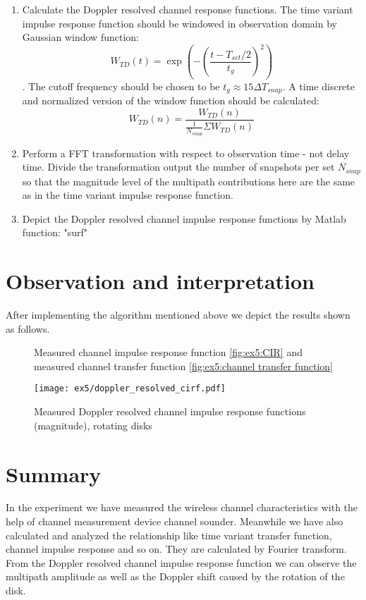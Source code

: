 \begin{enumerate}
	\item Calculate the Doppler resolved channel response functions. The time variant impulse response function should be windowed in observation domain by Gaussian window function:
	$$ W_{TD}(t) = \exp \left( - \left( \frac{t-T_{set}/2}{t_g} \right)^2 \right) $$.
	The cutoff frequency should be chosen to be $t_g \approx 15 \Delta T_{snap}$. A time discrete and normalized version of the window function should be calculated:
	$$ W_{TD} (n) = \frac{W_{TD}(n)}{\frac{1}{N_{snap}} \Sigma W_{TD} (n)} $$
	\item Perform a FFT transformation with respect to observation time - not delay time. Divide the transformation output the number of snapshots per set $N_{snap}$ so that the magnitude level of the multipath contributions here are the same as in the time variant impulse response function.
	\item Depict the Doppler resolved channel impulse response functions by Matlab function: "surf"
\end{enumerate}
\section{Observation and interpretation}
After implementing the algorithm mentioned above we depict the results shown as follows.
\begin{figure}[H]
	\begin{center}
		\hspace{1in} %
	\end{center}
	\caption{Measured channel impulse response function \ref{fig:ex5:CIR} and measured channel transfer function \ref{fig:ex5:channel transfer function}}
	\label{fig:CIR and CTF}
\end{figure}

\begin{figure}[H]
	\begin{center}
		\texttt{[image: ex5/doppler\_resolved\_cirf.pdf]}
		\caption{Measured Doppler resolved channel impulse response functions (magnitude), rotating disks}
		\label{fig:ex5:doppler}
	\end{center}
\end{figure}

\section{Summary}
In the experiment we have measured the wireless channel characteristics with the help of channel measurement device channel sounder. Meanwhile we have also calculated and analyzed the relationship like time variant transfer function, channel impulse response and so on. They are calculated by Fourier transform. From the Doppler resolved channel impulse response function we can observe the multipath amplitude as well as the Doppler shift caused by the rotation of the disk. 